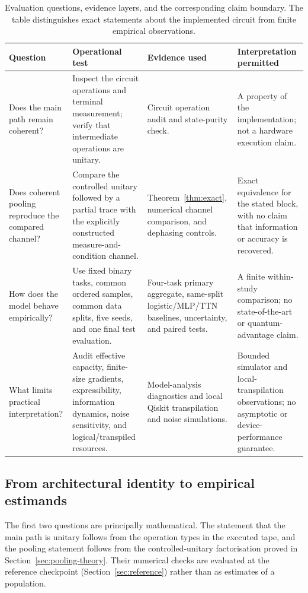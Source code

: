 \documentclass[conference]{IEEEtran}
\begin{document}
\begin{table}[!t]
\caption{Evaluation questions, evidence layers, and the corresponding claim boundary. The table distinguishes exact statements about the implemented circuit from finite empirical observations.}
\label{tab:questions}
\centering
\small
\begin{tabular}{@{}p{}p{}p{}p{}@{}}
\toprule
\textbf{Question} & \textbf{Operational test} & \textbf{Evidence used} & \textbf{Interpretation permitted} \\
\midrule
Does the main path remain coherent? & Inspect the circuit operations and terminal measurement; verify that intermediate operations are unitary. & Circuit operation audit and state-purity check. & A property of the implementation; not a hardware execution claim. \\
Does coherent pooling reproduce the compared channel? & Compare the controlled unitary followed by a partial trace with the explicitly constructed measure-and-condition channel. & Theorem~\ref{thm:exact}, numerical channel comparison, and dephasing controls. & Exact equivalence for the stated block, with no claim that information or accuracy is recovered. \\
How does the model behave empirically? & Use fixed binary tasks, common ordered samples, common data splits, five seeds, and one final test evaluation. & Four-task primary aggregate, same-split logistic/MLP/TTN baselines, uncertainty, and paired tests. & A finite within-study comparison; no state-of-the-art or quantum-advantage claim. \\
What limits practical interpretation? & Audit effective capacity, finite-size gradients, expressibility, information dynamics, noise sensitivity, and logical/transpiled resources. & Model-analysis diagnostics and local Qiskit transpilation and noise simulations. & Bounded simulator and local-transpilation observations; no asymptotic or device-performance guarantee. \\
\bottomrule
\end{tabular}
\end{table}

\subsection{From architectural identity to empirical estimands}
The first two questions are principally mathematical. The statement that the
main path is unitary follows from the operation types in the executed tape, and
the pooling statement follows from the controlled-unitary factorisation proved
in Section~\ref{sec:pooling-theory}. Their numerical checks are evaluated at the reference checkpoint (Section~\ref{sec:reference})
rather than as estimates of a population.
\end{document}
